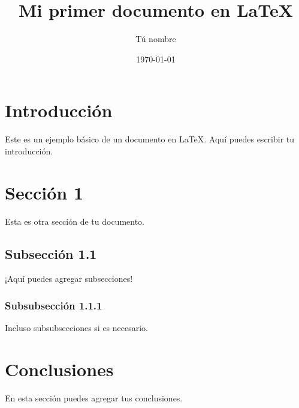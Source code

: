 \documentclass{elsarticle}
\begin{document}
\title{Mi primer documento en LaTeX}
\author{Tú nombre}
\date{\today}

\maketitle

\section{Introducción}
Este es un ejemplo básico de un documento en LaTeX. Aquí puedes escribir tu introducción.

\section{Sección 1}
Esta es otra sección de tu documento.

\subsection{Subsección 1.1}
¡Aquí puedes agregar subsecciones!

\subsubsection{Subsubsección 1.1.1}
Incluso subsubsecciones si es necesario.

\section{Conclusiones}
En esta sección puedes agregar tus conclusiones.
\end{document}
